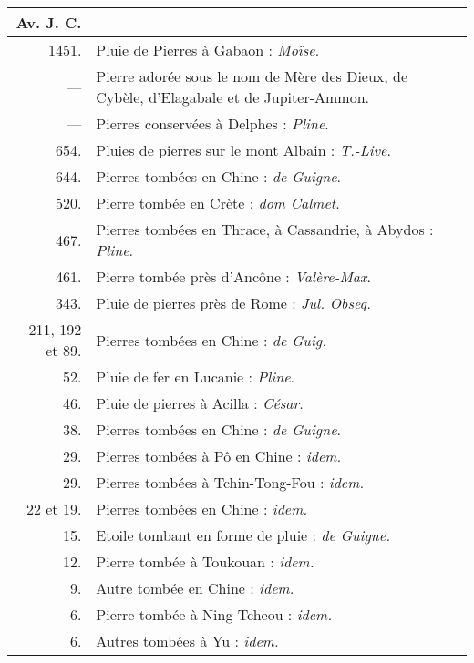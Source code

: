 \documentclass[a4paper, 12pt, oneside, french]{article}
\begin{document}
\begin{center}
    \begin{longtable}{r p{85mm}}
    \hline\hline
        Av. J. C.  &  \\ \hline\hline
        1451. & Pluie de Pierres à Gabaon : \emph{Moïse}.   \\ \hline
        --- & Pierre adorée sous le nom de Mère des Dieux, de Cybèle, d'Elagabale et de Jupiter-Ammon.   \\ \hline
        --- & Pierres conservées à Delphes : \emph{Pline}.   \\ \hline
        654. & Pluies de pierres sur le mont Albain : \emph{T.-Live}.   \\ \hline
        644. & Pierres tombées en Chine : \emph{de Guigne}.   \\ \hline
        520. & Pierre tombée en Crète : \emph{dom Calmet}.   \\ \hline
        467. & Pierres tombées en Thrace, à Cassandrie, à Abydos : \emph{Pline}.   \\ \hline
        461. & Pierre tombée près d'Ancône : \emph{Valère-Max}.   \\ \hline
        343. & Pluie de pierres près de Rome : \emph{Jul. Obseq.}   \\ \hline
        211, 192 et 89. & Pierres tombées en Chine : \emph{de Guig.}   \\ \hline
        52. & Pluie de fer en Lucanie : \emph{Pline}.   \\ \hline
        46. & Pluie de pierres à Acilla : \emph{César}.   \\ \hline
        38. & Pierres tombées en Chine : \emph{de Guigne}.   \\ \hline
        29. & Pierres tombées à Pô en Chine : \emph{idem.}   \\ \hline
        29. & Pierres tombées à Tchin-Tong-Fou : \emph{idem.}   \\ \hline
        22 et 19. & Pierres tombées en Chine : \emph{idem.}   \\ \hline
        15. & Etoile tombant en forme de pluie : \emph{de Guigne.}   \\ \hline
        12. & Pierre tombée à Toukouan : \emph{idem.}   \\ \hline
        9. & Autre tombée en Chine : \emph{idem.}   \\ \hline
        6. & Pierre tombée à Ning-Tcheou : \emph{idem.}   \\ \hline
        6. & Autres tombées à Yu : \emph{idem.}   \\ \hline

\end{longtable}
\end{center}
\end{document}
